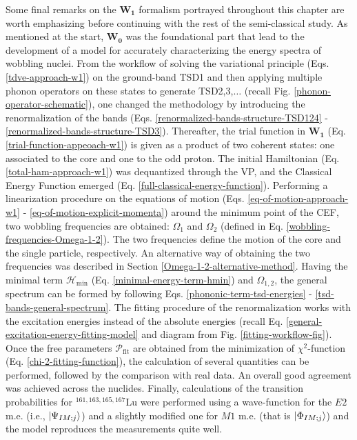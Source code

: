 Some final remarks on the $\mathbf{W_1}$ formalism portrayed throughout this chapter are worth emphasizing before continuing with the rest of the semi-classical study. As mentioned at the start, $\mathbf{W_0}$ was the foundational part that lead to the development of a model for accurately characterizing the energy spectra of wobbling nuclei. From the workflow of solving the variational principle (Eqs. \ref{tdve-approach-w1}) on the ground-band TSD1 and then applying multiple phonon operators on these states to generate TSD2,3,$\dots$ (recall Fig. \ref{phonon-operator-schematic}), one changed the methodology by introducing the renormalization of the bands (Eqs. \ref{renormalized-bands-structure-TSD124} - \ref{renormalized-bands-structure-TSD3}). Thereafter, the trial function in $\mathbf{W_1}$ (Eq. \ref{trial-function-appeoach-w1}) is given as a product of two coherent states: one associated to the core and one to the odd proton. The initial Hamiltonian (Eq. \ref{total-ham-approach-w1}) was dequantized through the VP, and the Classical Energy Function emerged (Eq. \ref{full-classical-energy-function}). Performing a linearization procedure on the equations of motion (Eqs. \ref{eq-of-motion-approach-w1} - \ref{eq-of-motion-explicit-momenta}) around the minimum point of the CEF, two wobbling frequencies are obtained: $\Omega_1$ and $\Omega_2$ (defined in Eq. \ref{wobbling-frequencies-Omega-1-2}). The two frequencies define the motion of the core and the single particle, respectively. An alternative way of obtaining the two frequencies was described in Section \ref{Omega-1-2-alternative-method}. Having the minimal term $\mathcal{H}_\text{min}$ (Eq. \ref{minimal-energy-term-hmin}) and $\Omega_{1,2}$, the general spectrum can be formed by following Eqs. \ref{phononic-term-tsd-energies} - \ref{tsd-bands-general-spectrum}. The fitting procedure of the renormalization works with the excitation energies instead of the absolute energies (recall Eq. \ref{general-excitation-energy-fitting-model} and diagram from Fig. \ref{fitting-workflow-fig}). Once the free parameters $\mathcal{P}_\text{fit}$ are obtained from the minimization of $\chi^2$-function (Eq. \ref{chi-2-fitting-function}), the calculation of several quantities can be performed, followed by the comparison with real data. An overall good agreement was achieved across the nuclides. Finally, calculations of the transition probabilities for $^{161,163,165,167}$Lu were performed using a wave-function for the $E2$ m.e. (i.e., $\ket{\Psi_{IM;j}}$) and a slightly modified one for $M1$ m.e. (that is $\ket{\Phi_{IM;j}}$) and the model reproduces the measurements quite well.

